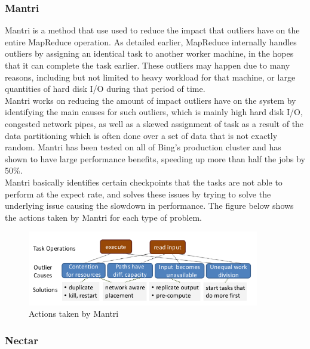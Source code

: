 \documentclass[]{article}
\begin{document}
\subsubsection{Mantri}
Mantri is a method that use used to reduce the impact that outliers have on the entire MapReduce operation. As detailed earlier, MapReduce internally handles outliers by assigning an identical task to another worker machine, in the hopes that it can complete the task earlier. These outliers may happen due to many reasons, including but not limited to heavy workload for that machine, or large quantities of hard disk I/O during that period of time. \\

Mantri works on reducing the amount of impact outliers have on the system by identifying the main causes for such outliers, which is mainly high hard disk I/O, congested network pipes, as well as a skewed assignment of task as a result of the data partitioning which is often done over a set of data that is not exactly random. Mantri has been tested on all of Bing's production cluster and has shown to have large performance benefits, speeding up more than half the jobs by 50\%. \\

Mantri basically identifies certain checkpoints that the tasks are not able to perform at the expect rate, and solves these issues by trying to solve the underlying issue causing the slowdown in performance. The figure below shows the actions taken by Mantri for each type of problem. \\
\begin{figure}[here]
	\begin{center}
		\includegraphics[width=0.9\textwidth]{mantri11.png}
		\caption{Actions taken by Mantri}
	\end{center}
\end{figure}


\subsubsection{Nectar}
\end{document}
